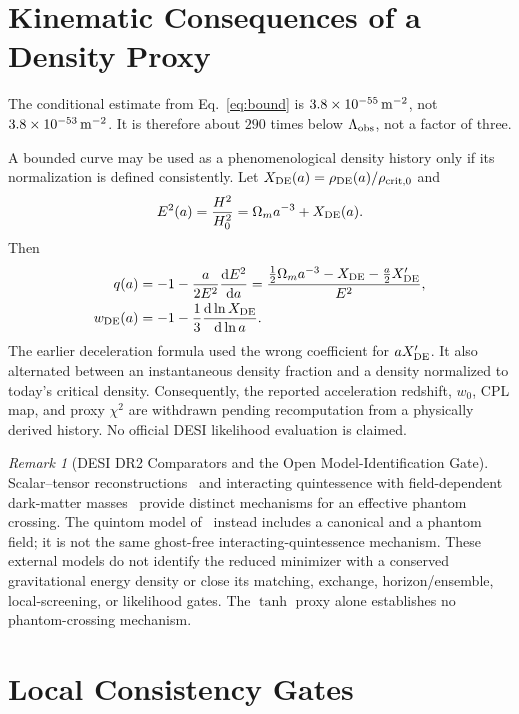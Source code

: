 \documentclass[12pt,a4paper]{article}
\theoremstyle{definition}
\theoremstyle{plain}
\theoremstyle{remark}
\newtheorem{remark}[definition]{Remark}
\newcommand{\dd}{\mathrm{d}}
\begin{document}
\section{Kinematic Consequences of a Density Proxy}\label{sec:observations}

The conditional estimate from Eq.~\eqref{eq:bound} is
\(3.8\times10^{-55}\,{\rm m}^{-2}\), not
\(3.8\times10^{-53}\,{\rm m}^{-2}\).  It is therefore about \(290\) times
below \(\Lambda_{\rm obs}\), not a factor of three.

A bounded curve may be used as a phenomenological density history only if its
normalization is defined consistently.  Let
\(X_{\rm DE}(a)=\rho_{\rm DE}(a)/\rho_{\rm crit,0}\) and
\[
 E^2(a)=\frac{H^2}{H_0^2}=\Omega_ma^{-3}+X_{\rm DE}(a).
\]
Then
\begin{align}
 q(a)&=-1-\frac{a}{2E^2}\frac{\dd E^2}{\dd a}
 =\frac{\tfrac12\Omega_ma^{-3}-X_{\rm DE}
 -\tfrac a2X_{\rm DE}'}{E^2},\label{eq:q-correct}\\
 w_{\rm DE}(a)&=-1-\frac13\frac{\dd\ln X_{\rm DE}}{\dd\ln a}.
 \label{eq:weff}
\end{align}
The earlier deceleration formula used the wrong coefficient for
\(aX_{\rm DE}'\).  It also alternated between an instantaneous density
fraction and a density normalized to today's critical density.  Consequently,
the reported acceleration redshift, \(w_0\), CPL map, and proxy
\(\chi^2\) are withdrawn pending recomputation from a physically derived
history.  No official DESI likelihood evaluation is claimed.

\begin{remark}[DESI DR2 Comparators and the Open Model-Identification Gate]
Scalar--tensor reconstructions~\cite{Efstratiou2025} and interacting
quintessence with field-dependent dark-matter masses~\cite{Antusch2026}
provide distinct mechanisms for an effective phantom crossing.
The quintom model of~\cite{Sahoo2026} instead includes a canonical and a
phantom field; it is not the same ghost-free interacting-quintessence
mechanism. These external models do not identify the reduced minimizer
with a conserved gravitational energy density or close its matching,
exchange, horizon/ensemble, local-screening, or likelihood gates.
The $\tanh$ proxy alone establishes no phantom-crossing mechanism.
\end{remark}

\section{Local Consistency Gates}
\end{document}
